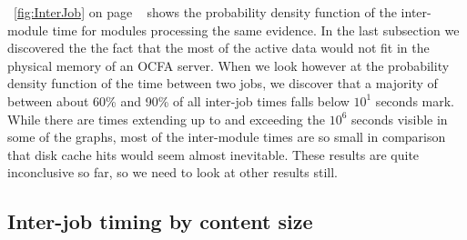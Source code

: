  ~\ref{fig:InterJob} on page ~\pageref{fig:Interjob} shows the probability density function of the inter-module time for modules processing the same evidence.
In the last subsection we discovered the the fact that the most of the active data would not fit in the physical memory of an OCFA server. When we look however at the probability density function of the time between two jobs, we discover that a majority of between about 60\% and 90\% of all inter-job times falls below $10^1$ seconds mark. While there are times extending up to and exceeding the $10^6$ seconds visible in some of the graphs, most of the inter-module times are so small in comparison that disk cache hits would seem almost inevitable. These results are quite inconclusive so far, so we need to look at other results still.
\subsection{Inter-job timing by content size}

